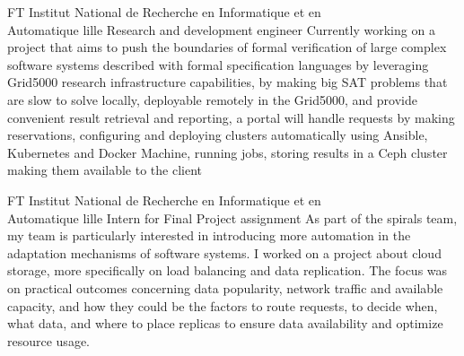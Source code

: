 \documentclass[10pt]{article} %
\begin{document}
\begin{paracol}{2}



{FT} %
{Institut National de Recherche en Informatique et en\\Automatique lille} %
{Research and development engineer} %
{Currently working on a project that aims to push the boundaries of formal verification of large complex software systems described with formal specification languages by leveraging Grid5000 research infrastructure capabilities, by making big SAT problems that are slow to solve locally, deployable remotely in the Grid5000, and provide convenient result retrieval and reporting, a portal will handle requests by making reservations, configuring and deploying clusters automatically using Ansible, Kubernetes and Docker Machine, running jobs, storing results in a Ceph cluster making them available to the client} %


\vspace{-\baselineskip}\medskip %

{FT} %
{Institut National de Recherche en Informatique et en\\Automatique lille} %
{Intern for Final Project assignment} %
{As part of the spirals team, my team is particularly interested in introducing more automation in the adaptation mechanisms of software systems. I worked on a project about cloud storage, more specifically on load balancing and data replication. The focus was on practical outcomes concerning data popularity, network traffic and available capacity, and how they could be the factors to route requests, to decide when, what data, and where to  place replicas to ensure data availability and optimize resource usage.} %

\vspace{-\baselineskip}\medskip %


\end{paracol}
\end{document}

